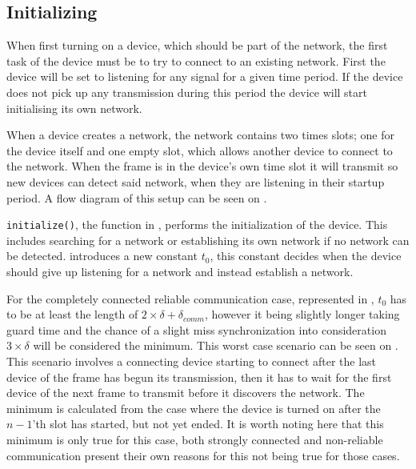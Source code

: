 \subsection{Initializing} %
\label{sub:setupCCRC} 
When first turning on a device, which should be part of the network, the first task of the device must be to try to connect to an existing network.
First the device will be set to listening for any signal for a given time period. 
If the device does not pick up any transmission during this period the device will start initialising its own network.

When a device creates a network, the network contains two times slots; one for the device itself and one empty slot, which allows another device to connect to the network.
When the frame is in the device's own time slot it will transmit so new devices can detect said network, when they are listening in their startup period.  
A flow diagram of this setup can be seen on .

 
\noindent
\texttt{initialize()}, the function in , performs the initialization of the device.
This includes searching for a network or establishing its own network if no network can be detected.
 introduces a new constant $t_0$, this constant decides when the device should give up listening for a network and instead establish a network.

For the completely connected reliable communication case, represented in , $t_0$ has to be at least the length of $2 \times \delta + \delta_{comm}$, however it being slightly longer taking guard time and the chance of a slight miss synchronization into consideration $3 \times \delta$ will be considered the minimum. 
This worst case scenario can be seen on .
This scenario involves a connecting device starting to connect after the last device of the frame has begun its transmission, then it has to wait for the first device of the next frame to transmit before it discovers the network. 
The minimum is calculated from the case where the device is turned on after the $n-1$'th slot has started, but not yet ended.
It is worth noting here that this minimum is only true for this case, both strongly connected and non-reliable communication present their own reasons for this not being true for those cases.

